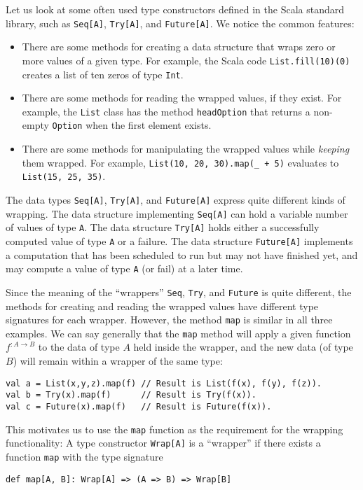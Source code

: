 Let us look at some often used type constructors defined in the Scala
standard library, such as \lstinline!Seq[A]!, \lstinline!Try[A]!,
and \lstinline!Future[A]!. We notice the common features:
\begin{itemize}
\item There are some methods for creating a data structure that wraps zero
or more values of a given type. For example, the Scala code \lstinline!List.fill(10)(0)!
creates a list of ten zeros of type \lstinline!Int!.
\item There are some methods for reading the wrapped values, if they exist.
For example, the \lstinline!List! class has the method \lstinline!headOption!
that returns a non-empty \lstinline!Option! when the first element
exists.
\item There are some methods for manipulating the wrapped values while \emph{keeping}
them wrapped. For example, \lstinline!List(10, 20, 30).map(_ + 5)!
evaluates to \lstinline!List(15, 25, 35)!.
\end{itemize}
The data types \lstinline!Seq[A]!, \lstinline!Try[A]!, and \lstinline!Future[A]!
express quite different kinds of wrapping. The data structure implementing
\lstinline!Seq[A]! can hold a variable number of values of type \lstinline!A!.
The data structure \lstinline!Try[A]! holds either a successfully
computed value of type \lstinline!A! or a failure. The data structure
\lstinline!Future[A]! implements a computation that has been scheduled
to run but may not have finished yet, and may compute a value of type
\lstinline!A! (or fail) at a later time.

Since the meaning of the \textsf{``}wrappers\textsf{''} \lstinline!Seq!, \lstinline!Try!,
and \lstinline!Future! is quite different, the methods for creating
and reading the wrapped values have different type signatures for
each wrapper. However, the method \lstinline!map! is similar in all
three examples. We can say generally that the \lstinline!map! method
will apply a given function $f^{:A\rightarrow B}$ to the data of
type $A$ held inside the wrapper, and the new data (of type $B$)
will remain within a wrapper of the same type:
\begin{lstlisting}
val a = List(x,y,z).map(f) // Result is List(f(x), f(y), f(z)).
val b = Try(x).map(f)      // Result is Try(f(x)).
val c = Future(x).map(f)   // Result is Future(f(x)).
\end{lstlisting}
This motivates us to use the \lstinline!map! function as the requirement
for the wrapping functionality: A type constructor \lstinline!Wrap[A]!
is a \textsf{``}wrapper\textsf{''} if there exists a function \lstinline!map! with
the  type signature
\begin{lstlisting}
def map[A, B]: Wrap[A] => (A => B) => Wrap[B]
\end{lstlisting}

